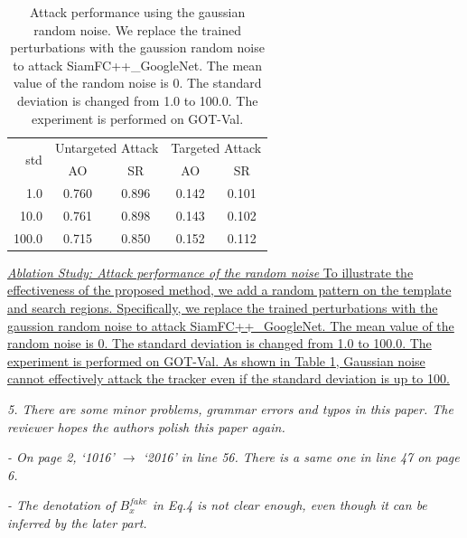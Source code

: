 \documentclass[12pt]{article}
\begin{document}
\begin{table}[t]
  \renewcommand\thetable{XII}
  \centering
  \caption{Attack performance using the gaussian random noise. We replace the trained perturbations with the gaussion random noise to attack SiamFC++\_GoogleNet. The mean value of the random noise is 0. The standard deviation is changed from 1.0 to 100.0. The experiment is performed on GOT-Val.}
  \begin{tabular}{@{}rcccc@{}}
  \toprule
  \multirow{2}{*}[-2pt]{std} & \multicolumn{2}{c}{Untargeted Attack} & \multicolumn{2}{c}{Targeted Attack} \\ \cmidrule{2-5}
                             & AO                & SR                & AO               & SR               \\ \midrule
  1.0                        & 0.760             & 0.896             & 0.142            & 0.101            \\
  10.0                       & 0.761             & 0.898             & 0.143            & 0.102            \\
  100.0                      & 0.715             & 0.850             & 0.152            & 0.112            \\ \bottomrule        
  \end{tabular}
  \label{table:noise}
\end{table}

\uline{\textit{Ablation Study: Attack performance of the random noise} To illustrate the effectiveness of the proposed method, we add a random pattern on the template and search regions. 
Specifically, we replace the trained perturbations with the gaussion random noise to attack SiamFC++\_GoogleNet. The mean value of the random noise is 0. The standard deviation is changed from 1.0 to 100.0. The experiment is performed on GOT-Val.
As shown in Table \ref{table:noise}, Gaussian noise cannot effectively attack the tracker even if the standard deviation is up to 100.
}

\textit{
5. There are some minor problems, grammar errors and typos in this paper. The reviewer hopes the authors polish this paper again.}

\textit{- On page 2, ‘1016’ $\rightarrow$ ‘2016’ in line 56. There is a same one in line 47 on page 6.}

\textit{- The denotation of $B_x^{fake}$ in Eq.4 is not clear enough, even though it can be inferred by the later part.}
\end{document}
